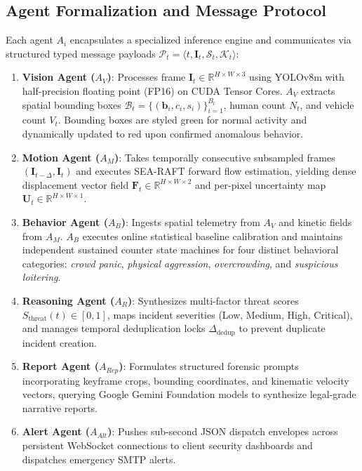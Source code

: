 \documentclass[conference]{IEEEtran}
\begin{document}
\subsection{Agent Formalization and Message Protocol}
Each agent $A_i$ encapsulates a specialized inference engine and communicates via structured typed message payloads $\mathcal{P}_t = \langle t, \mathbf{I}_t, \mathcal{S}_t, \mathcal{K}_t \rangle$:

\begin{enumerate}
    \item \textbf{Vision Agent ($A_V$)}: Processes frame $\mathbf{I}_t \in \mathbb{R}^{H \times W \times 3}$ using YOLOv8m with half-precision floating point (FP16) on CUDA Tensor Cores. $A_V$ extracts spatial bounding boxes $\mathcal{B}_t = \{(\mathbf{b}_i, c_i, s_i)\}_{i=1}^{B_t}$, human count $N_t$, and vehicle count $V_t$. Bounding boxes are styled green for normal activity and dynamically updated to red upon confirmed anomalous behavior.
    \item \textbf{Motion Agent ($A_M$)}: Takes temporally consecutive subsampled frames $(\mathbf{I}_{t-\Delta}, \mathbf{I}_t)$ and executes SEA-RAFT forward flow estimation, yielding dense displacement vector field $\mathbf{F}_t \in \mathbb{R}^{H \times W \times 2}$ and per-pixel uncertainty map $\mathbf{U}_t \in \mathbb{R}^{H \times W \times 1}$.
    \item \textbf{Behavior Agent ($A_B$)}: Ingests spatial telemetry from $A_V$ and kinetic fields from $A_M$. $A_B$ executes online statistical baseline calibration and maintains independent sustained counter state machines for four distinct behavioral categories: \textit{crowd panic}, \textit{physical aggression}, \textit{overcrowding}, and \textit{suspicious loitering}.
    \item \textbf{Reasoning Agent ($A_R$)}: Synthesizes multi-factor threat scores $S_{\text{threat}}(t) \in [0, 1]$, maps incident severities (Low, Medium, High, Critical), and manages temporal deduplication locks $\Delta_{\text{dedup}}$ to prevent duplicate incident creation.
    \item \textbf{Report Agent ($A_{Rep}$)}: Formulates structured forensic prompts incorporating keyframe crops, bounding coordinates, and kinematic velocity vectors, querying Google Gemini Foundation models to synthesize legal-grade narrative reports.
    \item \textbf{Alert Agent ($A_{Alt}$)}: Pushes sub-second JSON dispatch envelopes across persistent WebSocket connections to client security dashboards and dispatches emergency SMTP alerts.
\end{enumerate}
\end{document}
